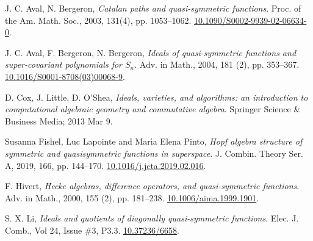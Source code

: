 \documentclass[11pt]{amsart}
\theoremstyle{definition}
\numberwithin{equation}{section}
\begin{document}
\vskip 1in

\begin{thebibliography}{999}

 J. C. Aval, N. Bergeron,
\textit{Catalan paths and quasi-symmetric functions}.
Proc. of the Am. Math. Soc., 2003, 131(4), pp. 1053--1062.
\href{https://doi.org/10.1090/S0002-9939-02-06634-0}{10.1090/S0002-9939-02-06634-0}.

 J. C. Aval, F. Bergeron, N. Bergeron,
\textit{Ideals of quasi-symmetric functions and super-covariant polynomials for $S_n$}.
Adv. in Math., 2004, 181 (2), pp. 353--367.
\href{https://doi.org/10.1016/S0001-8708(03)00068-9}{10.1016/S0001-8708(03)00068-9}.

 D. Cox, J. Little, D. O'Shea,
\textit{Ideals, varieties, and algorithms: an introduction to computational
algebraic geometry and commutative algebra}.
Springer Science \& Business Media; 2013 Mar 9.

Susanna Fishel, Luc Lapointe and Mar\'{\i}a Elena Pinto,
\textit{Hopf algebra structure of symmetric and quasisymmetric
              functions in superspace}.
 {J. Combin. Theory Ser. A}, 2019, 166, pp.  {144--170}.
\href{https://doi-org/10.1016/j.jcta.2019.02.016}{10.1016/j.jcta.2019.02.016}.

 F. Hivert, 
\textit{Hecke algebras, difference operators, and quasi-symmetric
              functions}.
Adv. in Math., 2000, 155 (2), pp. 181--238.
\href{https://doi-org/10.1006/aima.1999.1901}{10.1006/aima.1999.1901}.

 S. X. Li,
\textit{Ideals and quotients of diagonally quasi-symmetric functions}.
Elec. J. Comb., Vol 24, Issue \#3, P3.3.
\href{https://doi.org/10.37236/6658}{10.37236/6658}.
\end{thebibliography}
\end{document}
